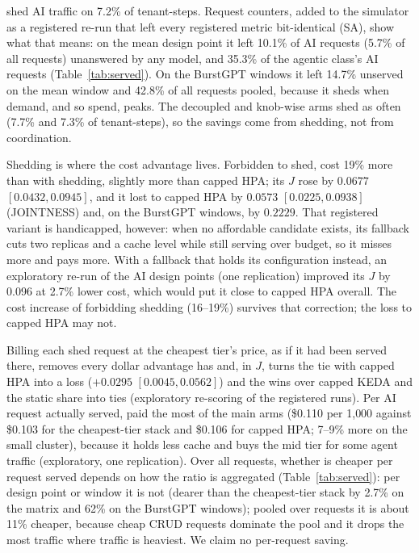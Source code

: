 \jcac{} shed AI traffic on 7.2\% of tenant-steps. Request counters, added to
the simulator as a registered re-run that left every registered metric
bit-identical (SA), show what that means: on the mean design point it left
10.1\% of AI requests (5.7\% of all requests) unanswered by any model, and
35.3\% of the agentic class's AI requests (Table~\ref{tab:served}). On the
BurstGPT windows it left 14.7\% unserved on the mean window and 42.8\% of
all requests pooled, because it sheds when demand, and so spend, peaks. The
decoupled and knob-wise arms shed as often (7.7\% and 7.3\% of
tenant-steps), so the savings come from shedding, not from coordination.

Shedding is where the cost advantage lives. Forbidden to shed, \jcac{} cost
19\% more than with shedding, slightly more than capped HPA; its $J$ rose by
$0.0677$ $[0.0432,0.0945]$, and it lost to capped HPA by $0.0573$
$[0.0225,0.0938]$ (JOINTNESS) and, on the BurstGPT windows, by $0.2229$.
That registered variant is handicapped, however: when no affordable
candidate exists, its fallback cuts two replicas and a cache level while
still serving over budget, so it misses more and pays more. With a fallback
that holds its configuration instead, an exploratory re-run of the AI
design points (one replication) improved its $J$ by 0.096 at 2.7\% lower
cost, which would put it close to capped HPA overall. The cost increase of
forbidding shedding (16--19\%) survives that correction; the loss to capped
HPA may not.

Billing each shed request at the cheapest tier's price, as if it had been
served there, removes every dollar advantage \jcac{} has and, in $J$, turns
the tie with capped HPA into a loss ($+0.0295$ $[0.0045,0.0562]$) and the
wins over capped KEDA and the static share into ties (exploratory
re-scoring of the registered runs). Per AI request actually served,
\jcac{} paid the most of the main arms (\$0.110 per 1{,}000 against
\$0.103 for the cheapest-tier stack and \$0.106 for capped HPA; 7--9\% more
on the small cluster), because it holds less cache and buys the mid tier for
some agent traffic (exploratory, one replication). Over all requests,
whether \jcac{} is cheaper per request served depends on how the ratio is
aggregated (Table~\ref{tab:served}): per design point or window it is not
(dearer than the cheapest-tier stack by 2.7\% on the matrix and 62\% on the
BurstGPT windows); pooled over requests it is about 11\% cheaper, because
cheap CRUD requests dominate the pool and it drops the most traffic where
traffic is heaviest. We claim no per-request saving.

